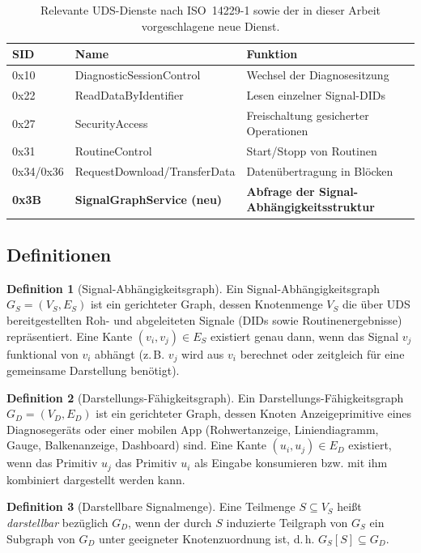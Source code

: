 ﻿\documentclass[a4paper,12pt]{article}
\theoremstyle{definition}
\newtheorem{definition}{Definition}
\begin{document}
\begin{table}[h]
\centering
\small
\begin{tabular}{@{}llp{6.5cm}@{}}
\toprule
SID & Name & Funktion \\
\midrule
0x10 & DiagnosticSessionControl & Wechsel der Diagnosesitzung \\
0x22 & ReadDataByIdentifier & Lesen einzelner Signal-DIDs \\
0x27 & SecurityAccess & Freischaltung gesicherter Operationen \\
0x31 & RoutineControl & Start/Stopp von Routinen \\
0x34/0x36 & RequestDownload/TransferData & Datenübertragung in Blöcken \\
\textbf{0x3B} & \textbf{SignalGraphService (neu)} & \textbf{Abfrage der Signal-Abhängigkeitsstruktur} \\
\bottomrule
\end{tabular}
\caption{Relevante UDS-Dienste nach ISO~14229-1 sowie der in dieser Arbeit vorgeschlagene neue Dienst.}
\label{tab:uds-services}
\end{table}

\subsection{Definitionen}

\begin{definition}[Signal-Abhängigkeitsgraph]
	Ein Signal-Abhängigkeitsgraph $G_S = (V_S, E_S)$ ist ein gerichteter Graph, dessen Knotenmenge $V_S$ die über UDS bereitgestellten Roh- und abgeleiteten Signale (DIDs sowie Routinenergebnisse) repräsentiert. Eine Kante $(v_i, v_j) \in E_S$ existiert genau dann, wenn das Signal $v_j$ funktional von $v_i$ abhängt (z.\,B. $v_j$ wird aus $v_i$ berechnet oder zeitgleich für eine gemeinsame Darstellung benötigt).
\end{definition}

\begin{definition}[Darstellungs-Fähigkeitsgraph]
	Ein Darstellungs-Fähigkeitsgraph $G_D = (V_D, E_D)$ ist ein gerichteter Graph, dessen Knoten Anzeigeprimitive eines Diagnosegeräts oder einer mobilen App (Rohwertanzeige, Liniendiagramm, Gauge, Balkenanzeige, Dashboard) sind. Eine Kante $(u_i, u_j) \in E_D$ existiert, wenn das Primitiv $u_j$ das Primitiv $u_i$ als Eingabe konsumieren bzw. mit ihm kombiniert dargestellt werden kann.
\end{definition}

\begin{definition}[Darstellbare Signalmenge]
	Eine Teilmenge $S \subseteq V_S$ heißt \emph{darstellbar} bezüglich $G_D$, wenn der durch $S$ induzierte Teilgraph von $G_S$ ein Subgraph von $G_D$ unter geeigneter Knotenzuordnung ist, d.\,h. $G_S[S] \subseteq G_D$.
\end{definition}
\end{document}
